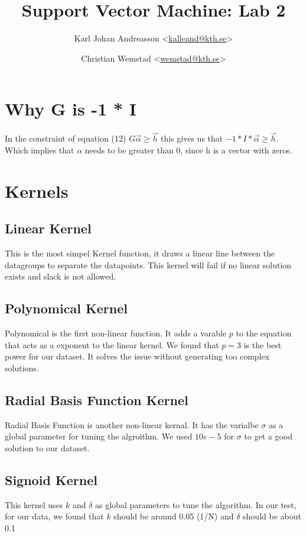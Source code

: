 \documentclass[a4paper]{article}
\title{Support Vector Machine: Lab 2}
\author{Karl Johan Andreasson <\href{mailto:kalleand@kth.se}{kalleand@kth.se}> %
\and Christian Wemstad <\href{mailto:wemstad@kth.se}{wemstad@kth.se}> %
}
\begin{document}
\thispagestyle{empty}
\maketitle
\thispagestyle{empty}
\pagestyle{empty}
\newpage
\tableofcontents
\newpage
\pagestyle{fancy}
\setcounter{page}{1}
\section{Why G is -1 * I}
In the constraint of equation (12) $G\vec{\alpha}\geq \vec{h}$ this
gives us that  $-1*I*\vec{\alpha} \geq \vec{h} $. Which implies that $\alpha$ needs to be
greater than 0, since h is a vector with zeros.
\section{Kernels}
\subsection{Linear Kernel}
This is the most simpel Kernel function, it draws a linear line between the
datagroups to separate the datapoints. This kernel will fail if no linear
solution exists and slack is not allowed. 

\subsection{Polynomical Kernel}
Polynomical is the first non-linear function. It adds a varable $p$
to the equation that acts as a exponent to the linear kernel. We found that
$p=3$ is the best power for our dataset. It solves the issue without generating
too complex solutions.

\subsection{Radial Basis Function Kernel}
Radial Basis Function is another non-linear kernal. It has the varialbe
$\sigma$ as a global parameter for tuning the algroithm. We used $10e-5$ for
$\sigma$ to get a good solution to our dataset.

\subsection{Signoid Kernel}
This kernel uses $k$ and $\delta$ as global parameters to tune the algorithm. In
our test, for our data, we found that $k$ should be around 0.05 (1/N) and $\delta$
should be about 0.1
\end{document}
